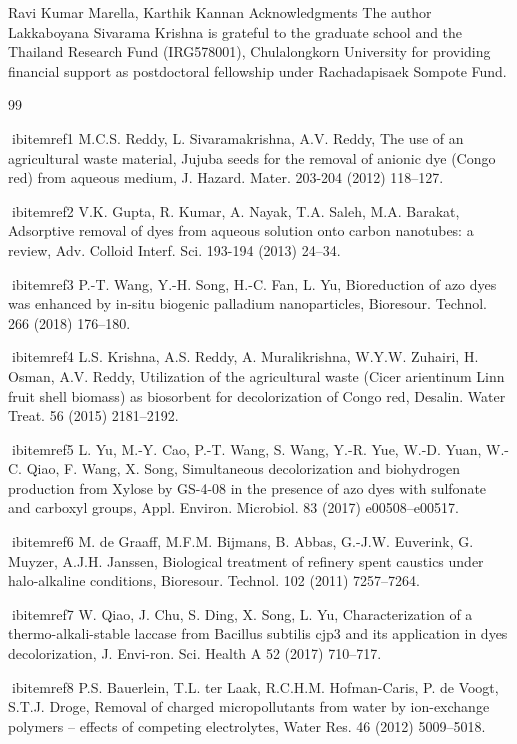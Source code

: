\documentclass[final,5p,times,twocolumn,authoryear]{elsarticle}
\begin{document}
Ravi Kumar Marella, Karthik Kannan
Acknowledgments
The author Lakkaboyana Sivarama Krishna is grateful to the graduate school and the Thailand Research Fund (IRG578001), Chulalongkorn University for providing ﬁnancial support as postdoctoral fellowship under Rachadapisaek Sompote Fund.


\begin{thebibliography}{99}

ibitem{ref1} M.C.S. Reddy, L. Sivaramakrishna, A.V. Reddy, The use of an agricultural waste material, Jujuba seeds for the removal of anionic dye (Congo red) from aqueous medium, J. Hazard. Mater. 203-204 (2012) 118–127.

ibitem{ref2} V.K. Gupta, R. Kumar, A. Nayak, T.A. Saleh, M.A. Barakat, Adsorptive removal of dyes from aqueous solution onto carbon nanotubes: a review, Adv. Colloid Interf. Sci. 193-194 (2013) 24–34.

ibitem{ref3} P.-T. Wang, Y.-H. Song, H.-C. Fan, L. Yu, Bioreduction of azo dyes was enhanced by in-situ biogenic palladium nanoparticles, Bioresour. Technol. 266 (2018) 176–180.

ibitem{ref4} L.S. Krishna, A.S. Reddy, A. Muralikrishna, W.Y.W. Zuhairi, H. Osman, A.V. Reddy, Utilization of the agricultural waste (Cicer arientinum Linn fruit shell biomass) as biosorbent for decolorization of Congo red, Desalin. Water Treat. 56 (2015) 2181–2192.

ibitem{ref5} L. Yu, M.-Y. Cao, P.-T. Wang, S. Wang, Y.-R. Yue, W.-D. Yuan, W.-C. Qiao, F. Wang, X. Song, Simultaneous decolorization and biohydrogen production from Xylose by GS-4-08 in the presence of azo dyes with sulfonate and carboxyl groups, Appl. Environ. Microbiol. 83 (2017) e00508–e00517.

ibitem{ref6} M. de Graaff, M.F.M. Bijmans, B. Abbas, G.-J.W. Euverink, G. Muyzer, A.J.H. Janssen, Biological treatment of reﬁnery spent caustics under halo-alkaline conditions, Bioresour. Technol. 102 (2011) 7257–7264.

ibitem{ref7} W. Qiao, J. Chu, S. Ding, X. Song, L. Yu, Characterization of a thermo-alkali-stable laccase from Bacillus subtilis cjp3 and its application in dyes decolorization, J. Envi-ron. Sci. Health A 52 (2017) 710–717.

ibitem{ref8} P.S. Bauerlein, T.L. ter Laak, R.C.H.M. Hofman-Caris, P. de Voogt, S.T.J. Droge, Removal of charged micropollutants from water by ion-exchange polymers – effects of competing electrolytes, Water Res. 46 (2012) 5009–5018.


\end{thebibliography}
\end{document}
